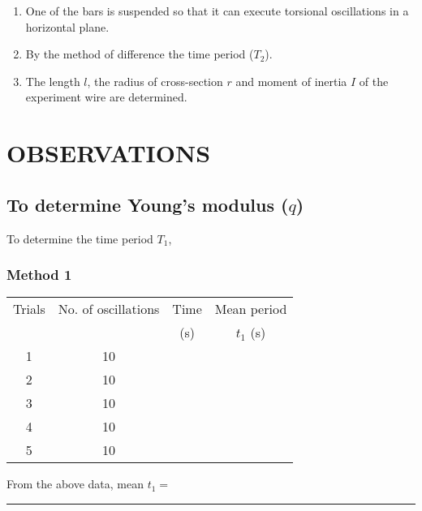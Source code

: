 \documentclass[12pt,a4paper]{article}
\begin{document}
		\begin{enumerate}
			
			\item 	One of the bars is suspended so that it can execute torsional oscillations in a horizontal plane.
			
			\item 	By the method of difference the time period ($T_{2}$).
			
			\item	The length $l$, the radius of cross-section $r$ and moment of inertia $I$ of the experiment wire are determined.
		\end{enumerate}
	\section{OBSERVATIONS}
	
		\subsection{To determine Young's modulus ($q$)}
			
			To determine the time period $T_{1}$,
			\subsubsection{Method 1}
			\begin{center}
				\begin{tabular}{|c|c|c|c|}
				\hline
				\rowcolor{b1!50}Trials&	No. of oscillations&	Time&	Mean period \\
				\rowcolor{b1!50}& &(s) &$t_{1}$ (s) \\ \hline
				1& 10&& \\ \hline
				2& 10&& \\ \hline
				3& 10&& \\ \hline
				4& 10&& \\ \hline
				5& 10&& \\ \hline								
			\end{tabular}
			\end{center}
			\vspace{5pt}
			From the above data, mean $t_{1} = $ \rule{20ex}{0.2pt}
\end{document}
